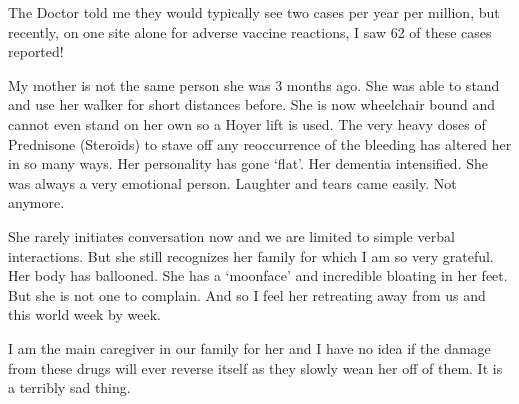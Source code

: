 The Doctor told me they would typically see two cases per year per million, but
recently, on one site alone for adverse vaccine reactions, I saw 62 of these
cases reported!

My mother is not the same person she was 3 months ago. She was able to stand and
use her walker for short distances before. She is now wheelchair bound and
cannot even stand on her own so a Hoyer lift is used. The very heavy doses of
Prednisone (Steroids) to stave off any reoccurrence of the bleeding has altered
her in so many ways. Her personality has gone ‘flat’. Her dementia
intensified. She was always a very emotional person. Laughter and tears came
easily. Not anymore.

She rarely initiates conversation now and we are limited to simple verbal
interactions. But she still recognizes her family for which I am so very
grateful. Her body has ballooned. She has a ‘moonface’ and incredible bloating
in her feet. But she is not one to complain. And so I feel her retreating away
from us and this world week by week.

I am the main caregiver in our family for her and I have no idea if the damage
from these drugs will ever reverse itself as they slowly wean her off of
them. It is a terribly sad thing.

